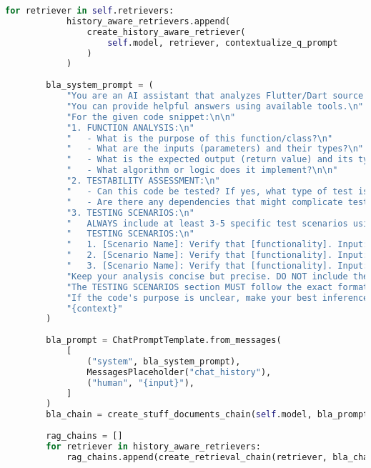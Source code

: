 \begin{lstlisting}[language=Python, caption={$\texttt{AI\_Agent}$ class.}, label={lst:12}]
        for retriever in self.retrievers:
            history_aware_retrievers.append(
                create_history_aware_retriever(
                    self.model, retriever, contextualize_q_prompt
                )
            )
        
        bla_system_prompt = (
            "You are an AI assistant that analyzes Flutter/Dart source code to identify its business logic for test generation.\n"
            "You can provide helpful answers using available tools.\n"
            "For the given code snippet:\n\n"
            "1. FUNCTION ANALYSIS:\n"
            "   - What is the purpose of this function/class?\n"
            "   - What are the inputs (parameters) and their types?\n"
            "   - What is the expected output (return value) and its type?\n"
            "   - What algorithm or logic does it implement?\n\n"
            "2. TESTABILITY ASSESSMENT:\n"
            "   - Can this code be tested? If yes, what type of test is appropriate (unit/widget/integration)?\n"
            "   - Are there any dependencies that might complicate testing?\n\n"
            "3. TESTING SCENARIOS:\n"
            "   ALWAYS include at least 3-5 specific test scenarios using EXACTLY this format:\n\n"
            "   TESTING SCENARIOS:\n"
            "   1. [Scenario Name]: Verify that [functionality]. Input: [specific input values]. Expected: [specific output/behavior].\n"
            "   2. [Scenario Name]: Verify that [functionality]. Input: [specific input values]. Expected: [specific output/behavior].\n"
            "   3. [Scenario Name]: Verify that [functionality]. Input: [specific input values]. Expected: [specific output/behavior].\n\n"
            "Keep your analysis concise but precise. DO NOT include the source code in your answer.\n"
            "The TESTING SCENARIOS section MUST follow the exact format shown above, with specific input values and expected outputs.\n"
            "If the code's purpose is unclear, make your best inference based on the implementation details.\n"
            "{context}"
        )
        
        bla_prompt = ChatPromptTemplate.from_messages(
            [
                ("system", bla_system_prompt),
                MessagesPlaceholder("chat_history"),
                ("human", "{input}"),
            ]
        )
        bla_chain = create_stuff_documents_chain(self.model, bla_prompt)
        
        rag_chains = []
        for retriever in history_aware_retrievers:
            rag_chains.append(create_retrieval_chain(retriever, bla_chain))
            

\end{lstlisting}
